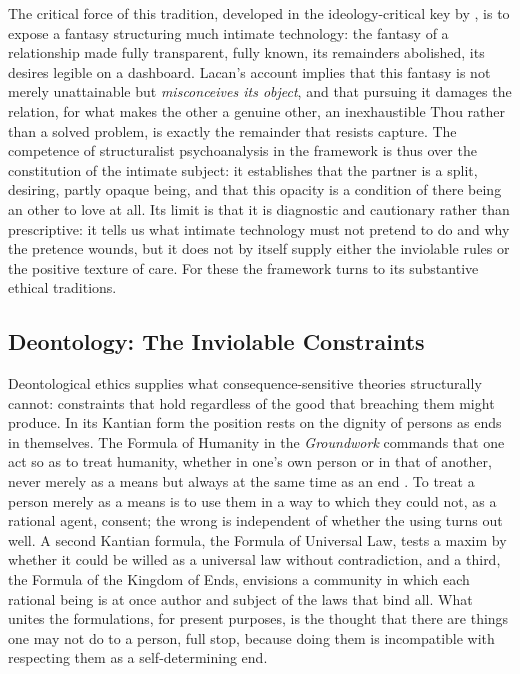\documentclass[11pt,a4paper]{article}
\begin{document}
The critical force of this tradition, developed in the ideology-critical key by \textcite{zizek1989sublime}, is to expose a fantasy structuring much intimate technology: the fantasy of a relationship made fully transparent, fully known, its remainders abolished, its desires legible on a dashboard. Lacan's account implies that this fantasy is not merely unattainable but \emph{misconceives its object}, and that pursuing it damages the relation, for what makes the other a genuine other, an inexhaustible Thou rather than a solved problem, is exactly the remainder that resists capture. The competence of structuralist psychoanalysis in the framework is thus over the constitution of the intimate subject: it establishes that the partner is a split, desiring, partly opaque being, and that this opacity is a condition of there being an other to love at all. Its limit is that it is diagnostic and cautionary rather than prescriptive: it tells us what intimate technology must not pretend to do and why the pretence wounds, but it does not by itself supply either the inviolable rules or the positive texture of care. For these the framework turns to its substantive ethical traditions.

\subsection{Deontology: The Inviolable Constraints}\label{p01:sec:deontology}

Deontological ethics supplies what consequence-sensitive theories structurally cannot: constraints that hold regardless of the good that breaching them might produce. In its Kantian form the position rests on the dignity of persons as ends in themselves. The Formula of Humanity in the \emph{Groundwork} commands that one act so as to treat humanity, whether in one's own person or in that of another, never merely as a means but always at the same time as an end \parencite{kant1785groundwork}. To treat a person merely as a means is to use them in a way to which they could not, as a rational agent, consent; the wrong is independent of whether the using turns out well. A second Kantian formula, the Formula of Universal Law, tests a maxim by whether it could be willed as a universal law without contradiction, and a third, the Formula of the Kingdom of Ends, envisions a community in which each rational being is at once author and subject of the laws that bind all. What unites the formulations, for present purposes, is the thought that there are things one may not do to a person, full stop, because doing them is incompatible with respecting them as a self-determining end.
\end{document}
